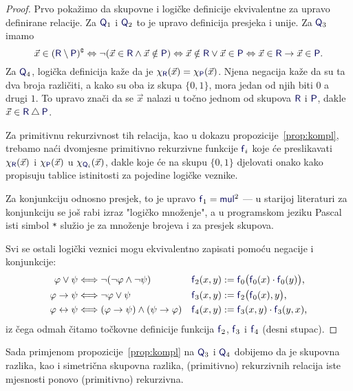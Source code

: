 \begin{proof}
Prvo pokažimo da skupovne i logičke definicije ekvivalentne za upravo definirane relacije. Za $\f Q_1$ i $\f Q_2$ to je upravo definicija presjeka i unije. Za $\f Q_3$ imamo
    \begin{equation}
    \vec x\in(\f R\setminus\f P)\kompl\Leftrightarrow\lnot(\vec x\in\f R\land\vec x\notin\f P)\Leftrightarrow\vec x\notin\f R\lor\vec x\in\f P\Leftrightarrow\vec x\in \f R\to\vec x\in\f P\text.
\end{equation}
Za $\f Q_4$, logička definicija kaže da je $\chi_{\f R}(\vec x)=\chi_{\f P}(\vec x)$. Njena negacija kaže da su ta dva broja različiti, a kako su oba iz skupa $\{0,1\}$, mora jedan od njih biti $0$ a drugi $1$. To upravo znači da se $\vec x$ nalazi u točno jednom od skupova $\f R$ i $\f P$, dakle $\vec x\in\f R\mathbin\triangle\f P$.

Za primitivnu rekurzivnost tih relacija, kao u dokazu propozicije~\ref{prop:kompl}, trebamo naći dvomjesne primitivno rekurzivne funkcije $\f f_i$ koje će preslikavati $\chi_{\f R}(\vec x)$ i $\chi_{\f P}(\vec x)$ u $\chi_{\f Q_i}(\vec x)$, dakle koje će na skupu $\{0,1\}$ djelovati onako kako propisuju tablice istinitosti za pojedine logičke veznike.

Za konjunkciju odnosno presjek, to je upravo $\f f_1=\f{mul}^2$ --- u starijoj literaturi za konjunkciju se još rabi izraz "logičko množenje", a u programskom jeziku Pascal isti simbol \texttt{*} služio je za množenje brojeva i za presjek skupova.

Svi se ostali logički veznici mogu ekvivalentno zapisati pomoću negacije i konjunkcije:
\begin{align}
    \varphi\lor\psi&\Longleftrightarrow\lnot(\lnot\varphi\land\lnot\psi)
    &
    \f f_2(x,y)&:=
    \f f_0\bigl(
      \f f_0(x)\cdot\f f_0(y)
    \bigr)\text,
    \\
    \varphi\to\psi&\Longleftrightarrow\lnot\varphi\lor\psi
    &
    \f f_3(x,y)&:=\f f_2\bigl(\f f_0(x),y\bigr)\text,
    \\
    \varphi\leftrightarrow\psi&\Longleftrightarrow(\varphi\to\psi)\land(\psi\to\varphi)
    &
    \f f_4(x,y)&:=\f f_3(x,y)\cdot\f f_3(y,x)\text,
\end{align}
iz čega odmah čitamo točkovne definicije funkcija $\f f_2$, $\f f_3$ i $\f f_4$ (desni stupac).
\end{proof}

Sada primjenom propozicije~\ref{prop:kompl} na $\f Q_3$ i $\f Q_4$ dobijemo da je skupovna razlika, kao i simetrična skupovna razlika, (primitivno) rekurzivnih relacija iste mjesnosti ponovo (primitivno) rekurzivna.


